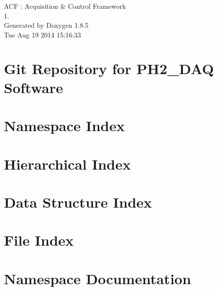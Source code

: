 \documentclass[twoside]{book}
\newcommand{\clearemptydoublepage}{%
  \newpage{\pagestyle{empty}\cleardoublepage}%
}
\begin{document}
\hypersetup{pageanchor=false}
\begin{titlepage}
\vspace*{7cm}
\begin{center}%
{\Large A\-C\-F \-: Acquisition \& Control Framework \\[1ex]\large 1. }\\
\vspace*{1cm}
{\large Generated by Doxygen 1.8.5}\\
\vspace*{0.5cm}
{\small Tue Aug 19 2014 15:16:33}\\
\end{center}
\end{titlepage}
\clearemptydoublepage
\tableofcontents
\clearemptydoublepage
{}
\hypersetup{pageanchor=true}

\chapter{Git Repository for P\-H2\-\_\-\-D\-A\-Q Software}
\label{md__r_e_a_d_m_e}
\hypertarget{md__r_e_a_d_m_e}{}

\chapter{Namespace Index}

\chapter{Hierarchical Index}

\chapter{Data Structure Index}

\chapter{File Index}

\chapter{Namespace Documentation}




\end{document}
